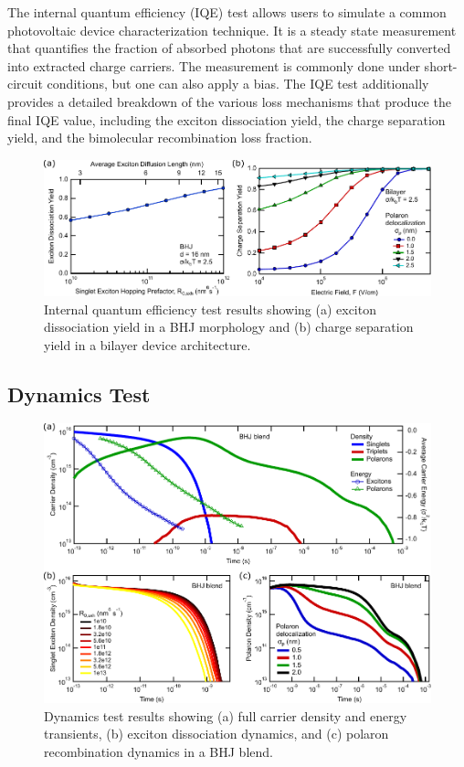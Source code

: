 \documentclass[%
 reprint,onecolumn,notitlepage,
superscriptaddress,longbibliography,
 amsmath,amssymb,
 aps,rmp,floatfix,
]{revtex4-1}
\begin{document}
The internal quantum efficiency (IQE) test allows users to simulate a common photovoltaic device characterization technique.
It is a steady state measurement that quantifies the fraction of absorbed photons that are successfully converted into extracted charge carriers. 
The measurement is commonly done under short-circuit conditions, but one can also apply a bias.
The IQE test additionally provides a detailed breakdown of the various loss mechanisms that produce the final IQE value, including the exciton dissociation yield, the charge separation yield, and the bimolecular recombination loss fraction.


\begin{figure}[h]
    \centering
    \includegraphics{IQE_example_data.pdf}
    \caption{Internal quantum efficiency test results showing (a) exciton dissociation yield in a BHJ morphology and (b) charge separation yield in a bilayer device architecture.}
    \label{fig:IQE_example}
\end{figure}

\subsection{Dynamics Test}

\begin{figure}[h]
    \centering
    \includegraphics{Dynamics_example_data.pdf}
    \caption{Dynamics test results showing (a) full carrier density and energy transients, (b) exciton dissociation dynamics, and (c) polaron recombination dynamics in a BHJ blend.}
    \label{fig:dynamics_example}
\end{figure}
\end{document}
